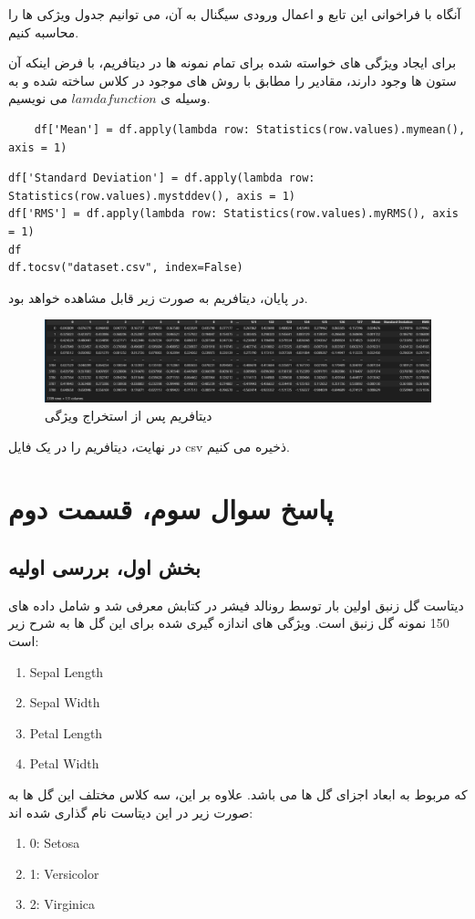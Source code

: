 آنگاه با فراخوانی این تابع و اعمال ورودی سیگنال به آن، می توانیم جدول ویژکی ها را محاسبه کنیم.

برای ایجاد ویژگی های خواسته شده برای تمام نمونه ها در دیتافریم، با فرض اینکه آن ستون ها وجود دارند، مقادیر را مطابق با روش های موجود در کلاس ساخته شده و به وسیله ی $lamda function$ می نویسیم.
\begin{verbatim}
	df['Mean'] = df.apply(lambda row: Statistics(row.values).mymean(), axis = 1)
\end{verbatim}
	
\begin{verbatim}
df['Standard Deviation'] = df.apply(lambda row: Statistics(row.values).mystddev(), axis = 1)
df['RMS'] = df.apply(lambda row: Statistics(row.values).myRMS(), axis = 1)
df
df.tocsv("dataset.csv", index=False)
\end{verbatim}
در پایان، دیتافریم به صورت زیر قابل مشاهده خواهد بود.
\begin{figure}[H]
	\centering
	\includegraphics[width=1\linewidth]{../img/6}
	\caption{دیتافریم پس از استخراج ویژگی}
	\label{fig:6}
\end{figure}
در نهایت، دیتافریم را در یک فایل csv ذخیره می کنیم.
\section{پاسخ سوال سوم، قسمت دوم}
\subsection{بخش اول، بررسی اولیه}
دیتاست گل زنبق اولین بار توسط رونالد فیشر در کتابش معرفی شد و شامل داده های 150 نمونه گل زنبق است. ویژگی های اندازه گیری شده برای این گل ها به شرح زیر است:
\begin{enumerate}
	\item Sepal Length
	\item Sepal Width
	\item Petal Length
	\item Petal Width
\end{enumerate}
که مربوط به ابعاد اجزای گل ها می باشد. علاوه بر این، سه کلاس مختلف این گل ها به صورت زیر در این دیتاست نام گذاری شده اند:
\begin{enumerate}
	\item 0: Setosa
	\item 1: Versicolor
	\item 2: Virginica
\end{enumerate}

